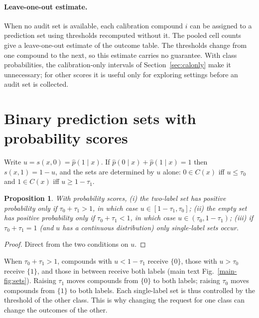\documentclass[10pt]{article}
\newtheorem{proposition}{Proposition}
\begin{document}
\paragraph{Leave-one-out estimate.} When no audit set is available, each calibration compound $i$ can be assigned to a prediction set using thresholds recomputed without it. The pooled cell counts give a leave-one-out estimate of the outcome table.\citep{vovk2015crossconformal,barber2021predictive} The thresholds change from one compound to the next, so this estimate carries no guarantee. With class probabilities, the calibration-only intervals of Section~\ref{sec:calonly} make it unnecessary; for other scores it is useful only for exploring settings before an audit set is collected.

\section{Binary prediction sets with probability scores}
\label{sec:geometry}

Write $u=s(x,0)=\hat p(1\mid x)$. If $\hat p(0\mid x)+\hat p(1\mid x)=1$ then $s(x,1)=1-u$, and the sets are determined by $u$ alone: $0\in C(x)$ iff $u\le\tau_0$ and $1\in C(x)$ iff $u\ge1-\tau_1$.

\begin{proposition}
\label{prop:regimes}
With probability scores, (i) the two-label set has positive probability only if $\tau_0+\tau_1>1$, in which case $u\in[1-\tau_1,\tau_0]$; (ii) the empty set has positive probability only if $\tau_0+\tau_1<1$, in which case $u\in(\tau_0,1-\tau_1)$; (iii) if $\tau_0+\tau_1=1$ (and $u$ has a continuous distribution) only single-label sets occur.
\end{proposition}
\begin{proof}
Direct from the two conditions on $u$.
\end{proof}

When $\tau_0+\tau_1>1$, compounds with $u<1-\tau_1$ receive $\{0\}$, those with $u>\tau_0$ receive $\{1\}$, and those in between receive both labels (main text Fig.~\ref{main-fig:sets}). Raising $\tau_1$ moves compounds from $\{0\}$ to both labels; raising $\tau_0$ moves compounds from $\{1\}$ to both labels. Each single-label set is thus controlled by the threshold of the other class. This is why changing the request for one class can change the outcomes of the other.

\end{document}
